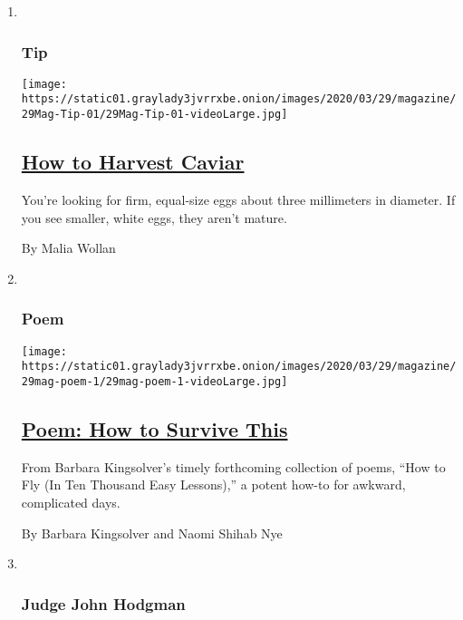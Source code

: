 \begin{enumerate}
\def\labelenumi{\arabic{enumi}.}
\item ~
  \hypertarget{tip}{%
  \subsubsection{Tip}\label{tip}}

  \texttt{[image: https://static01.graylady3jvrrxbe.onion/images/2020/03/29/magazine/29Mag-Tip-01/29Mag-Tip-01-videoLarge.jpg]}

  \hypertarget{how-to-harvest-caviar}{%
  \subsection{\texorpdfstring{\href{/2020/03/24/magazine/how-to-harvest-caviar.html}{How
  to Harvest
  Caviar}}{How to Harvest Caviar}}\label{how-to-harvest-caviar}}

  You're looking for firm, equal-size eggs about three millimeters in
  diameter. If you see smaller, white eggs, they aren't mature.

  By Malia Wollan
\item ~
  \hypertarget{poem}{%
  \subsubsection{Poem}\label{poem}}

  \texttt{[image: https://static01.graylady3jvrrxbe.onion/images/2020/03/29/magazine/29mag-poem-1/29mag-poem-1-videoLarge.jpg]}

  \hypertarget{poem-how-to-survive-this}{%
  \subsection{\texorpdfstring{\href{/2020/03/26/magazine/poem-how-to-survive-this.html}{Poem:
  How to Survive
  This}}{Poem: How to Survive This}}\label{poem-how-to-survive-this}}

  From Barbara Kingsolver's timely forthcoming collection of poems,
  ``How to Fly (In Ten Thousand Easy Lessons),'' a potent how-to for
  awkward, complicated days.

  By Barbara Kingsolver and Naomi Shihab Nye
\item ~
  \hypertarget{judge-john-hodgman}{%
  \subsubsection{Judge John Hodgman}\label{judge-john-hodgman}}


\end{enumerate}
